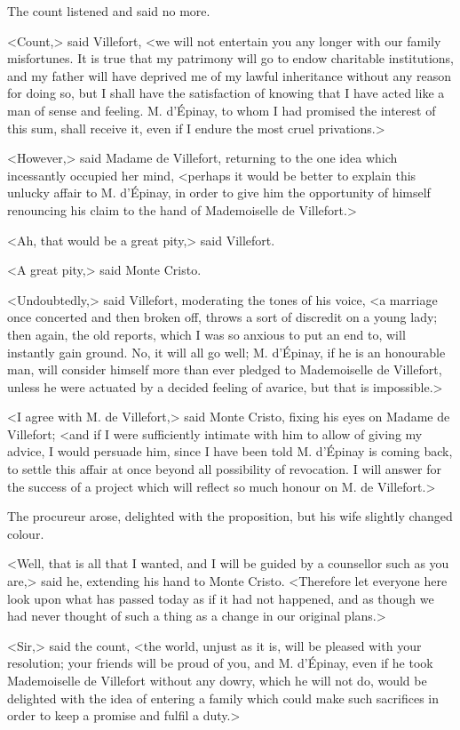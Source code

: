  The count listened and said no more. 

 <Count,> said Villefort, <we will not entertain you any longer with our family misfortunes. It is true that my patrimony will go to endow charitable institutions, and my father will have deprived me of my lawful inheritance without any reason for doing so, but I shall have the satisfaction of knowing that I have acted like a man of sense and feeling. M. d'Épinay, to whom I had promised the interest of this sum, shall receive it, even if I endure the most cruel privations.> 

 <However,> said Madame de Villefort, returning to the one idea which incessantly occupied her mind, <perhaps it would be better to explain this unlucky affair to M. d'Épinay, in order to give him the opportunity of himself renouncing his claim to the hand of Mademoiselle de Villefort.> 

 <Ah, that would be a great pity,> said Villefort. 

 <A great pity,> said Monte Cristo. 

 <Undoubtedly,> said Villefort, moderating the tones of his voice, <a marriage once concerted and then broken off, throws a sort of discredit on a young lady; then again, the old reports, which I was so anxious to put an end to, will instantly gain ground. No, it will all go well; M. d'Épinay, if he is an honourable man, will consider himself more than ever pledged to Mademoiselle de Villefort, unless he were actuated by a decided feeling of avarice, but that is impossible.> 

 <I agree with M. de Villefort,> said Monte Cristo, fixing his eyes on Madame de Villefort; <and if I were sufficiently intimate with him to allow of giving my advice, I would persuade him, since I have been told M. d'Épinay is coming back, to settle this affair at once beyond all possibility of revocation. I will answer for the success of a project which will reflect so much honour on M. de Villefort.> 

 The procureur arose, delighted with the proposition, but his wife slightly changed colour. 

 <Well, that is all that I wanted, and I will be guided by a counsellor such as you are,> said he, extending his hand to Monte Cristo. <Therefore let everyone here look upon what has passed today as if it had not happened, and as though we had never thought of such a thing as a change in our original plans.> 

 <Sir,> said the count, <the world, unjust as it is, will be pleased with your resolution; your friends will be proud of you, and M. d'Épinay, even if he took Mademoiselle de Villefort without any dowry, which he will not do, would be delighted with the idea of entering a family which could make such sacrifices in order to keep a promise and fulfil a duty.> 

